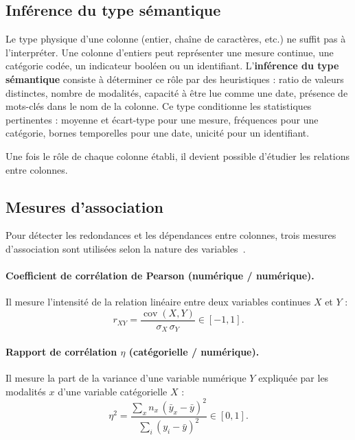 \subsection{Inférence du type sémantique}

Le type physique d'une colonne (entier, chaîne de caractères, etc.) ne suffit pas à l'interpréter. Une colonne d'entiers peut représenter une mesure continue, une catégorie codée, un indicateur booléen ou un identifiant. L'\textbf{inférence du type sémantique} consiste à déterminer ce rôle par des heuristiques : ratio de valeurs distinctes, nombre de modalités, capacité à être lue comme une date, présence de mots-clés dans le nom de la colonne. Ce type conditionne les statistiques pertinentes : moyenne et écart-type pour une mesure, fréquences pour une catégorie, bornes temporelles pour une date, unicité pour un identifiant.

Une fois le rôle de chaque colonne établi, il devient possible d'étudier les relations entre colonnes.

\subsection{Mesures d'association}

Pour détecter les redondances et les dépendances entre colonnes, trois mesures d'association sont utilisées selon la nature des variables~\cite{sweetviz}.

\paragraph{Coefficient de corrélation de Pearson (numérique / numérique).} Il mesure l'intensité de la relation linéaire entre deux variables continues $X$ et $Y$ :
\begin{equation}
r_{XY} = \frac{\operatorname{cov}(X,Y)}{\sigma_X\,\sigma_Y} \in [-1, 1].
\end{equation}

\paragraph{Rapport de corrélation $\eta$ (catégorielle / numérique).} Il mesure la part de la variance d'une variable numérique $Y$ expliquée par les modalités $x$ d'une variable catégorielle $X$ :
\begin{equation}
\eta^2 = \frac{\sum_{x} n_x\,(\bar{y}_x - \bar{y})^2}{\sum_{i} (y_i - \bar{y})^2} \in [0, 1].
\end{equation}

